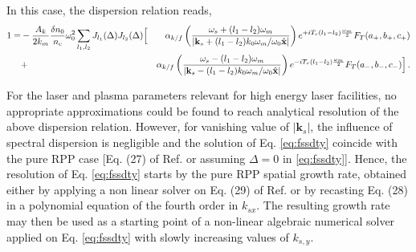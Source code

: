 \documentclass[
 reprint,
 amsmath,amssymb,
 aps,
]{revtex4-1}
\begin{document}
\begin{widetext}
In this case, the dispersion relation reads,
\begin{align}
   1 =& - \frac{A_k}{2k_m}  \frac{\delta n_0}{n_c}\omega_0^2
    \sum_{l_1, l_2} 
     J_{l_1}(\Delta)J_{l_2}(\Delta) 
      \Big[&
       \alpha_{k/f}\left(\frac{\omega_s+(l_1-l_2)\omega_m}
  {\vert\mathbf{k}_s+(l_1-l_2)k_0\omega_m/\omega_0\Hat{\mathbf{x}} \vert}
  \right) 
      e^{ + iT_{r} (l_1-l_2)\frac{ \omega_m}{2} }  F_T(a_+,b_+,c_+)
     \nonumber \\&
      + &\alpha_{k/f}\left(\frac{\omega_s-(l_1-l_2)\omega_m}
  {\vert\mathbf{k}_s-(l_1-l_2)k_0\omega_m/\omega_0\Hat{\mathbf{x}} \vert}
  \right) 
      e^{ - iT_{r} (l_1-l_2)\frac{ \omega_m}{2} }   F_T(a_-,b_-,c_-)
    \Big]
   \, .\label{eq:fssdty}
\end{align}
   
For the laser and plasma parameters relevant for high energy laser facilities, no appropriate  approximations could be found to reach analytical resolution of the above dispersion relation. However, for vanishing value of $\vert \mathbf{k}_s \vert $, the influence of spectral dispersion is negligible  and the solution of Eq. \eqref{eq:fssdty} coincide with the pure RPP case [Eq. (27) of Ref. \cite[]{POP_Ruyer_2021} or assuming $\Delta=0$ in \eqref{eq:fssdty}]. Hence, the resolution of Eq. \eqref{eq:fssdty} starts  by   the pure RPP spatial growth rate, obtained either by applying a non linear solver on Eq. (29) of Ref. \cite[]{POP_Ruyer_2021} or by recasting Eq. (28)  in a polynomial equation of the fourth order in $k_{sx}$. 
The resulting growth rate may  then be used as a starting point of a non-linear algebraic numerical solver applied on Eq. \eqref{eq:fssdty} with slowly increasing values of $k_{s,y}$.


\end{widetext}
\end{document}
